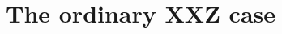 \documentclass[a4paper,10pt]{article}
\newcommand{\hubert}[1]{$\framebox{\tiny h}$\ \textbf{\texttt{{\color{blue}\footnotesize#1}}}}
\newcommand{\linnea}[1]{$\framebox{\tiny L}$\ \textbf{\texttt{{\color{red}\footnotesize#1}}}}
\newcommand{\Verma}[1]{\mathsf{V}_{#1}}
\newcommand{\FF}[1]{\widetilde{\mathsf{V}}_{#1}}
\begin{document}
\FloatBarrier

\section{The ordinary XXZ case}\label{UnitaryXXZ}



 



\end{document}
